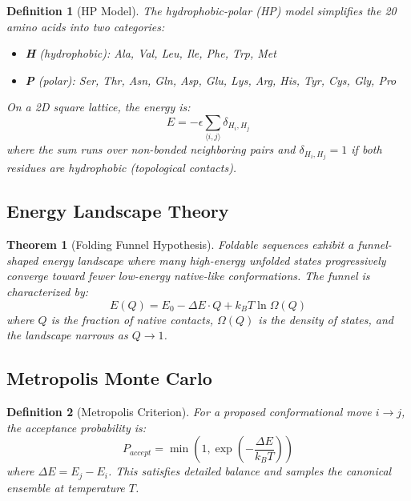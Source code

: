\documentclass[a4paper, 11pt]{article}
\newtheorem{definition}{Definition}[section]
\newtheorem{theorem}{Theorem}[section]
\begin{document}
\begin{definition}[HP Model]
The hydrophobic-polar (HP) model simplifies the 20 amino acids into two categories:
\begin{itemize}
\item \textbf{H} (hydrophobic): Ala, Val, Leu, Ile, Phe, Trp, Met
\item \textbf{P} (polar): Ser, Thr, Asn, Gln, Asp, Glu, Lys, Arg, His, Tyr, Cys, Gly, Pro
\end{itemize}
On a 2D square lattice, the energy is:
\begin{equation}
E = -\epsilon \sum_{\langle i,j \rangle} \delta_{H_i, H_j}
\end{equation}
where the sum runs over non-bonded neighboring pairs and $\delta_{H_i, H_j} = 1$ if both
residues are hydrophobic (topological contacts).
\end{definition}

\subsection{Energy Landscape Theory}

\begin{theorem}[Folding Funnel Hypothesis]
Foldable sequences exhibit a funnel-shaped energy landscape where many high-energy unfolded
states progressively converge toward fewer low-energy native-like conformations. The funnel
is characterized by:
\begin{equation}
E(Q) = E_0 - \Delta E \cdot Q + k_B T \ln \Omega(Q)
\end{equation}
where $Q$ is the fraction of native contacts, $\Omega(Q)$ is the density of states, and the
landscape narrows as $Q \to 1$.
\end{theorem}

\subsection{Metropolis Monte Carlo}

\begin{definition}[Metropolis Criterion]
For a proposed conformational move $i \to j$, the acceptance probability is:
\begin{equation}
P_{accept} = \min\left(1, \exp\left(-\frac{\Delta E}{k_B T}\right)\right)
\end{equation}
where $\Delta E = E_j - E_i$. This satisfies detailed balance and samples the canonical
ensemble at temperature $T$.
\end{definition}
\end{document}
